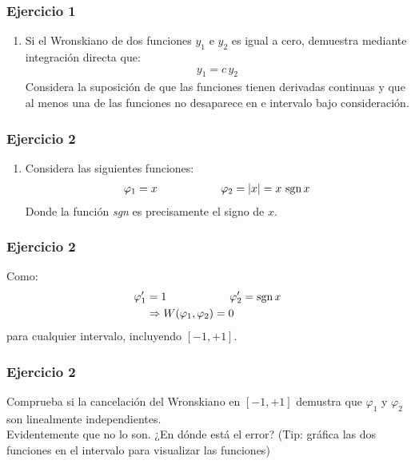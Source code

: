 \documentclass[12pt]{beamer}
\begin{document}
\begin{frame}
\frametitle{Ejercicio 1}
\begin{enumerate}
\item Si el Wronskiano de dos funciones $y_{1}$ e $y_{2}$ es igual a cero, demuestra mediante integración directa que:
\begin{align*}
y_{1} = c \, y_{2}
\end{align*}
Considera la suposición de que las funciones tienen derivadas continuas y que al menos una de las funciones no desaparece en e intervalo bajo consideración.
\seti
\end{enumerate}
\end{frame}
\begin{frame}
\frametitle{Ejercicio 2}
\begin{enumerate}
\conti    
\item Considera las siguientes funciones:
\begin{align*}
\varphi_{1} =  x \hspace{2cm} \varphi_{2} = \abs{x} = x \, \, \mbox{sgn} \, x
\end{align*}
Donde la función \textit{sgn} es precisamente el signo de $x$.
\seti
\end{enumerate}
\end{frame}
\begin{frame}
\frametitle{Ejercicio 2}
Como:
\begin{align*}
{\varphi}^{\prime}_{1} &=  1 \hspace{2cm} {\varphi}^{\prime}_{2} = \mbox{sgn} \, x \\
&\Rightarrow W(\varphi_{1}, \varphi_{2}) = 0
\end{align*}
para cualquier intervalo, incluyendo $[-1, +1]$.
\end{frame}
\begin{frame}
\frametitle{Ejercicio 2}
Comprueba si la cancelación del Wronskiano en $[-1, +1]$ demustra que $\varphi_{1}$ y $\varphi_{2}$ son linealmente independientes.
\\
\bigskip
Evidentemente que no lo son. ¿En dónde está el error? (Tip: gráfica las dos funciones en el intervalo para visualizar las funciones)
\end{frame}
\end{document}
